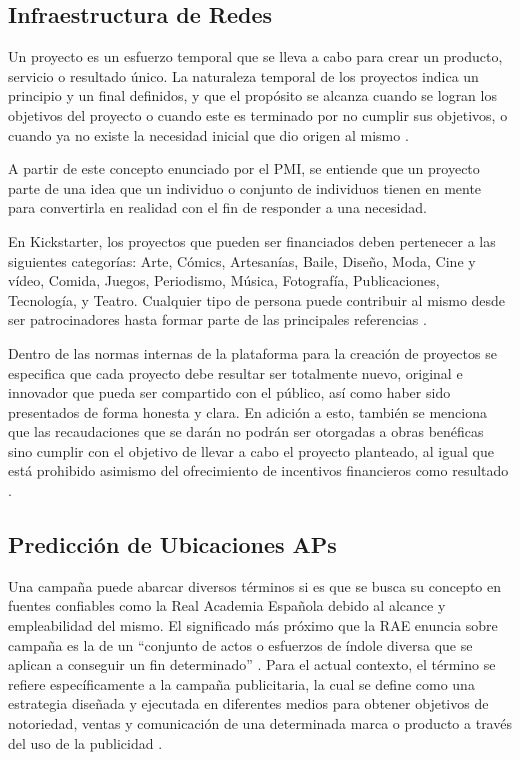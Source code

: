 \subsection{Infraestructura de Redes}
Un proyecto es un esfuerzo temporal que se lleva a cabo para crear un producto, servicio o resultado único. La naturaleza temporal de los proyectos indica un principio y un final definidos, y que el propósito se alcanza cuando se logran los objetivos del proyecto o cuando este es terminado por no cumplir sus objetivos, o cuando ya no existe la necesidad inicial que dio origen al mismo \parencite{bk_pmi2017pmbokguide}.

A partir de este concepto enunciado por el PMI, se entiende que un proyecto parte de una idea que un individuo o conjunto de individuos tienen en mente para convertirla en realidad con el fin de responder a una necesidad.

En Kickstarter, los proyectos que pueden ser financiados deben pertenecer a las siguientes categorías: Arte, Cómics, Artesanías, Baile, Diseño, Moda, Cine y vídeo, Comida, Juegos, Periodismo, Música, Fotografía, Publicaciones, Tecnología, y Teatro. Cualquier tipo de persona puede contribuir al mismo desde ser patrocinadores hasta formar parte de las principales referencias \parencite{cr_kickstarter_learn}.

Dentro de las normas internas de la plataforma para la creación de proyectos se especifica que cada proyecto debe resultar ser totalmente nuevo, original e innovador que pueda ser compartido con el público, así como haber sido presentados de forma honesta y clara. En adición a esto, también se menciona que las recaudaciones que se darán no podrán ser otorgadas a obras benéficas sino cumplir con el objetivo de llevar a cabo el proyecto planteado, al igual que está prohibido asimismo del ofrecimiento de incentivos financieros como resultado \parencite{cr_kickstarter_rules}.


\subsection{Predicción de Ubicaciones APs}
Una campaña puede abarcar diversos términos si es que se busca su concepto en fuentes confiables como la Real Academia Española debido al alcance y empleabilidad del mismo. El significado más próximo que la RAE enuncia sobre campaña es la de un “conjunto de actos o esfuerzos de índole diversa que se aplican a conseguir un fin determinado” \parencite{gl_rae}. Para el actual contexto, el término se refiere específicamente a la campaña publicitaria, la cual se define como una estrategia diseñada y ejecutada en diferentes medios para obtener objetivos de notoriedad, ventas y comunicación de una determinada marca o producto a través del uso de la publicidad \parencite{tec_cyberclic_campaign}.

